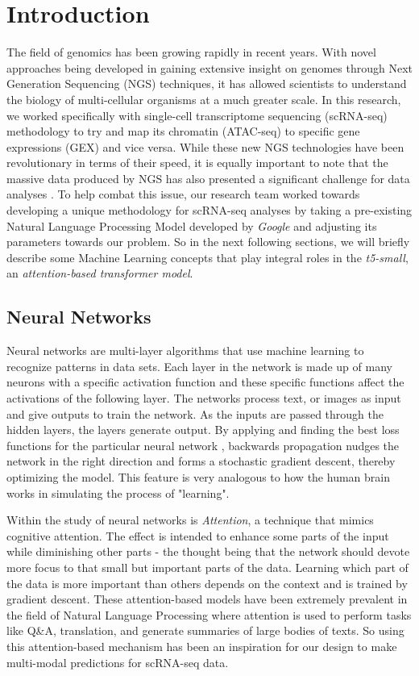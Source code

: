 \section{Introduction}

The field of genomics has been growing rapidly in recent years. 
With novel approaches being developed in gaining extensive insight on genomes through Next Generation Sequencing (NGS) techniques, it has allowed scientists to understand the biology of multi-cellular organisms at a much greater scale. 
In this research, we worked specifically with single-cell transcriptome sequencing (scRNA-seq) methodology to try and map its chromatin (ATAC-seq) to specific gene expressions (GEX) and vice versa. 
While these new NGS technologies have been revolutionary in terms of their speed, it is equally important to note that the massive data produced by NGS has also presented a significant challenge for data analyses \cite{one}. 
To help combat this issue, our research team worked towards developing a unique methodology for scRNA-seq analyses by taking a pre-existing Natural Language Processing Model developed by \emph{Google} and adjusting its parameters towards our problem. So in the next following sections, we will briefly describe some Machine Learning concepts that play integral roles in the \emph{t5-small}, an \emph{attention-based transformer model}.

\subsection{Neural Networks}

Neural networks are multi-layer algorithms that use machine learning to recognize patterns in data sets. 
Each layer in the network is made up of many neurons with a specific activation function and these specific functions affect the activations of the following layer. 
The networks process text, or images as input and give outputs to train the network. 
As the inputs are passed through the hidden layers, the layers generate output. By applying and finding the best loss functions for the particular neural network \cite{two}, backwards propagation nudges the network in the right direction and forms a stochastic gradient descent, thereby optimizing the model. 
This feature is very analogous to how the human brain works in simulating the process of "learning".

Within the study of neural networks is \emph{Attention}, a technique that mimics cognitive attention. 
The effect is intended to enhance some parts of the input while diminishing other parts - the thought being that the network should devote more focus to that small but important parts of the data. 
Learning which part of the data is more important than others depends on the context and is trained by gradient descent. 
These attention-based models have been extremely prevalent in the field of Natural Language Processing where attention is used to perform tasks like Q\&A, translation, and generate summaries of large bodies of texts. So using this attention-based mechanism has been an inspiration for our design to make multi-modal predictions for scRNA-seq data.

